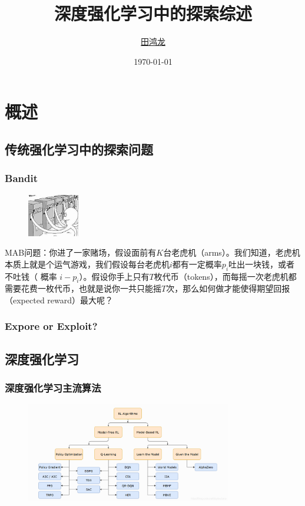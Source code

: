 \documentclass[aspectratio=169]{beamer}
\title{深度强化学习中的探索综述}
\author{\href{mailto:}{田鸿龙}}
\institute{Software Institute, Nanjing University}
\date{\today}
\begin{document}
\frame{\titlepage}

\section{概述}

\subsection{传统强化学习中的探索问题}
\begin{frame}
  \frametitle{Bandit}
  \begin{figure}
    \centering
    \includegraphics[width=0.2\textwidth]{imgs/bandit.jpeg}
  \end{figure}
  MAB问题：你进了一家赌场，假设面前有$K$台老虎机（arms）。我们知道，老虎机本质上就是个运气游戏，我们假设每台老虎机$i$都有一定概率$p_i$吐出一块钱，或者不吐钱（ 概率 $i-p_i$）。假设你手上只有$T$枚代币（tokens），而每摇一次老虎机都需要花费一枚代币，也就是说你一共只能摇$T$次，那么如何做才能使得期望回报（expected reward）最大呢？
\end{frame}

\begin{frame}
  \frametitle{Expore or Exploit?}

  

  

\end{frame}

\subsection{深度强化学习}

\begin{frame}
  \frametitle{深度强化学习主流算法}

  \begin{figure}
    \centering
    \includegraphics[width=0.8\textwidth]{imgs/DRL_agorithm.png}
  \end{figure}
\end{frame}
\end{document}
